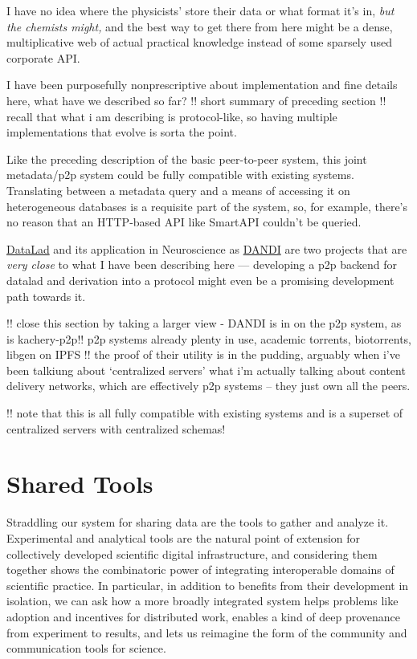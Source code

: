 \documentclass[notoc]{tufte-book}
\begin{document}
I have no idea where the physicists' store their data or what format
it's in, \emph{but the chemists might,} and the best way to get there
from here might be a dense, multiplicative web of actual practical
knowledge instead of some sparsely used corporate API.

I have been purposefully nonprescriptive about implementation and fine
details here, what have we described so far? !! short summary of
preceding section !! recall that what i am describing is protocol-like,
so having multiple implementations that evolve is sorta the point.

Like the preceding description of the basic peer-to-peer system, this
joint metadata/p2p system could be fully compatible with existing
systems. Translating between a metadata query and a means of accessing
it on heterogeneous databases is a requisite part of the system, so, for
example, there's no reason that an HTTP-based API like SmartAPI couldn't
be queried.

\href{https://www.datalad.org/}{DataLad} \citep{halchenkoDataLadDistributedSystem2021, hankeDefenseDecentralizedResearch2021}  and its application in
Neuroscience as \href{https://dandiarchive.org}{DANDI} are two projects
that are \emph{very close} to what I have been describing here ---
developing a p2p backend for datalad and derivation into a protocol
might even be a promising development path towards it.

!! close this section by taking a larger view - \citep{langilleBioTorrentsFileSharing2010}  DANDI is in on the p2p system,
as is kachery-p2p!! p2p systems already plenty in use, academic
torrents, biotorrents, libgen on IPFS !! the proof of their utility is
in the pudding, arguably when i've been talkiung about `centralized
servers' what i'm actually talking about content delivery networks,
which are effectively p2p systems -- they just own all the peers.

!! note that this is all fully compatible with existing systems and is a
superset of centralized servers with centralized schemas! 




\section{Shared Tools}



 Straddling our system for sharing data are the tools to
gather and analyze it. Experimental and analytical tools are the natural
point of extension for collectively developed scientific digital
infrastructure, and considering them together shows the combinatoric
power of integrating interoperable domains of scientific practice. In
particular, in addition to benefits from their development in isolation,
we can ask how a more broadly integrated system helps problems like
adoption and incentives for distributed work, enables a kind of deep
provenance from experiment to results, and lets us reimagine the form of
the community and communication tools for science.
\end{document}

